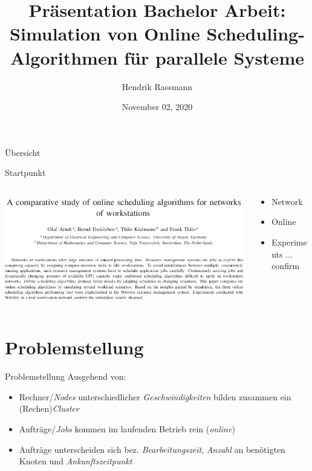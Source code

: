 \documentclass[aspectratio=169,10pt]{beamer}
\title{Pr\"asentation Bachelor Arbeit:\\
 Simulation von Online Scheduling-Algorithmen f\"ur parallele Systeme}
\author{Hendrik Rassmann}
\institute{TU Dortmund University - Department of Computer Science}
\date{November 02, 2020}
\begin{document}

\maketitle
\Large

\begin{frame}{\"Ubersicht}
\tableofcontents
\end{frame}


\begin{frame}[fragile]{Startpunkt}

\begin{columns}
	\begin{column}{0.57\paperwidth}
		\vspace{0.5pt}
		\includegraphics[width=\linewidth, clip]{images/Arndt}
	\end{column}
	\begin{column}[c]{0.43\paperwidth}
		\begin{itemize}
			\item \alert{Network}
			\item \alert{Online}
			\item \alert{Experiments} ... \alert{confirm}
		\end{itemize}
	\end{column}
\end{columns}
\end{frame}
\section{Problemstellung}


\begin{frame}[t,fragile]{Problemstellung}
Ausgehend von:

\begin{itemize}[<+->]
	\item Rechner/\emph{Nodes} unterschiedlicher \emph{Geschwindigkeiten} bilden zusammen ein (Rechen)\emph{Cluster} 
	\item Auftr\"age/\emph{Jobs} kommen im laufenden Betrieb rein (\emph{online})
	\item Auftr\"age unterscheiden sich bez. \emph{Bearbeitungszeit}, \emph{Anzahl} an ben\"otigten Knoten und \emph{Ankunftszeitpunkt}
\end{itemize}
\end{frame}
\end{document}
